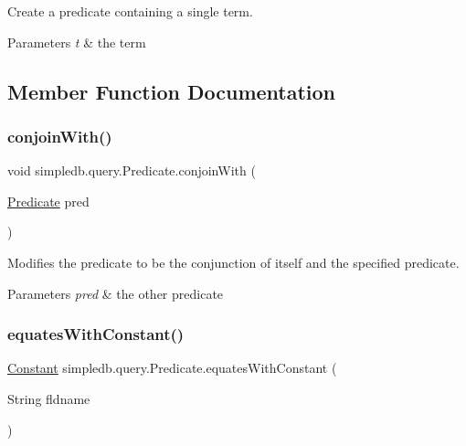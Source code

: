 Create a predicate containing a single term. 
\begin{DoxyParams}{Parameters}
{\em t} & the term \\
\hline
\end{DoxyParams}


\subsection{Member Function Documentation}
\mbox{\label{classsimpledb_1_1query_1_1Predicate_a986fd2943734aef4ed929e17d7d65e59}} 
\subsubsection{\texorpdfstring{conjoin\+With()}{conjoinWith()}}
{\footnotesize\ttfamily void simpledb.\+query.\+Predicate.\+conjoin\+With (\begin{DoxyParamCaption}\item[{\hyperlink{classsimpledb_1_1query_1_1Predicate}{Predicate}}]{pred }\end{DoxyParamCaption})\hspace{0.3cm}{\ttfamily [inline]}}

Modifies the predicate to be the conjunction of itself and the specified predicate. 
\begin{DoxyParams}{Parameters}
{\em pred} & the other predicate \\
\hline
\end{DoxyParams}
\mbox{\label{classsimpledb_1_1query_1_1Predicate_aeed39e1683b339b552f2855666c59e85}} 
\subsubsection{\texorpdfstring{equates\+With\+Constant()}{equatesWithConstant()}}
{\footnotesize\ttfamily \hyperlink{classsimpledb_1_1query_1_1Constant}{Constant} simpledb.\+query.\+Predicate.\+equates\+With\+Constant (\begin{DoxyParamCaption}\item[{String}]{fldname }\end{DoxyParamCaption})\hspace{0.3cm}{\ttfamily [inline]}}

